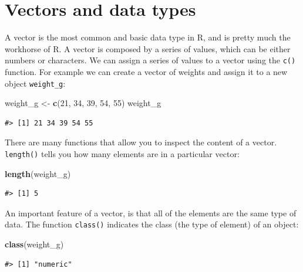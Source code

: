\documentclass[]{book}
\newenvironment{Shaded}{\begin{snugshade}}{\end{snugshade}}
\newcommand{\KeywordTok}[1]{\textcolor[rgb]{0.13,0.29,0.53}{\textbf{#1}}}
\newcommand{\DecValTok}[1]{\textcolor[rgb]{0.00,0.00,0.81}{#1}}
\newcommand{\StringTok}[1]{\textcolor[rgb]{0.31,0.60,0.02}{#1}}
\newcommand{\NormalTok}[1]{#1}
\begin{document}
\section{Vectors and data types}\label{vectors-and-data-types}

A vector is the most common and basic data type in R, and is pretty much
the workhorse of R. A vector is composed by a series of values, which
can be either numbers or characters. We can assign a series of values to
a vector using the \texttt{c()} function. For example we can create a
vector of weights and assign it to a new object \texttt{weight\_g}:

\begin{Shaded}
\begin{Highlighting}[]
\NormalTok{weight_g <-}\StringTok{ }\KeywordTok{c}\NormalTok{(}\DecValTok{21}\NormalTok{, }\DecValTok{34}\NormalTok{, }\DecValTok{39}\NormalTok{, }\DecValTok{54}\NormalTok{, }\DecValTok{55}\NormalTok{)}
\NormalTok{weight_g}
\end{Highlighting}
\end{Shaded}

\begin{verbatim}
#> [1] 21 34 39 54 55
\end{verbatim}

There are many functions that allow you to inspect the content of a
vector. \texttt{length()} tells you how many elements are in a
particular vector:

\begin{Shaded}
\begin{Highlighting}[]
\KeywordTok{length}\NormalTok{(weight_g)}
\end{Highlighting}
\end{Shaded}

\begin{verbatim}
#> [1] 5
\end{verbatim}

An important feature of a vector, is that all of the elements are the
same type of data. The function \texttt{class()} indicates the class
(the type of element) of an object:

\begin{Shaded}
\begin{Highlighting}[]
\KeywordTok{class}\NormalTok{(weight_g)}
\end{Highlighting}
\end{Shaded}

\begin{verbatim}
#> [1] "numeric"
\end{verbatim}
\end{document}

